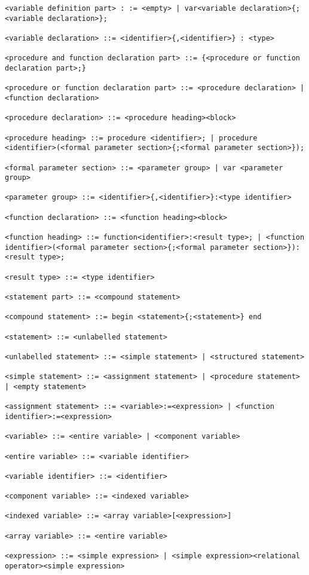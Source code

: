\documentclass[a4paper,oneside]{report}
\begin{document}
\begin{verbatim}
<variable definition part> : := <empty> | var<variable declaration>{;<variable declaration>};

<variable declaration> ::= <identifier>{,<identifier>} : <type>

<procedure and function declaration part> ::= {<procedure or function declaration part>;}

<procedure or function declaration part> ::= <procedure declaration> | <function declaration>

<procedure declaration> ::= <procedure heading><block>

<procedure heading> ::= procedure <identifier>; | procedure <identifier>(<formal parameter section>{;<formal parameter section>});

<formal parameter section> ::= <parameter group> | var <parameter group>

<parameter group> ::= <identifier>{,<identifier>}:<type identifier>

<function declaration> ::= <function heading><block>

<function heading> ::= function<identifier>:<result type>; | <function identifier>(<formal parameter section>{;<formal parameter section>}):<result type>;

<result type> ::= <type identifier>

<statement part> ::= <compound statement>

<compound statement> ::= begin <statement>{;<statement>} end

<statement> ::= <unlabelled statement>

<unlabelled statement> ::= <simple statement> | <structured statement>

<simple statement> ::= <assignment statement> | <procedure statement> | <empty statement>

<assignment statement> ::= <variable>:=<expression> | <function identifier>:=<expression>

<variable> ::= <entire variable> | <component variable>

<entire variable> ::= <variable identifier>

<variable identifier> ::= <identifier>

<component variable> ::= <indexed variable>

<indexed variable> ::= <array variable>[<expression>]

<array variable> ::= <entire variable>

<expression> ::= <simple expression> | <simple expression><relational operator><simple expression>


\end{verbatim}
\end{document}

